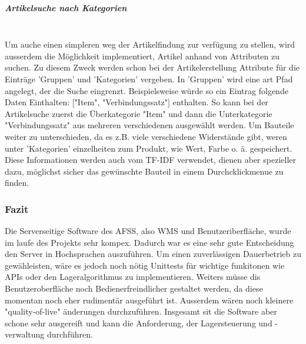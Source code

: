 \subparagraph{Artikelsuche nach Kategorien}\mbox{}\\
Um auche einen simpleren weg der Artikelfindung zur verfügung zu stellen, wird ausserdem die Möglichkeit implementiert, Artikel anhand von Attributen zu suchen. Zu diesem Zweck werden schon bei der Artikelerstellung Attribute für die Einträge 'Gruppen' und 'Kategorien' vergeben. In 'Gruppen' wird eine art Pfad angelegt, der die Suche eingrenzt. Beispielsweise würde so ein Eintrag folgende Daten Einthalten: ["Item", "Verbindungssatz"] enthalten. So kann bei der Artikelsuche zuerst die Überkategorie "Item" und dann die Unterkategorie "Verbindungssatz" aus mehreren verschiedenen ausgewählt werden. Um Bauteile weiter zu unterschieden, da es z.B. viele verschiedene Widerstände gibt, weren unter 'Kategorien' einzelheiten zum Produkt, wie Wert, Farbe o. ä. gespeichert.\\ 
Diese Informationen werden auch vom TF-IDF verwendet, dienen aber spezieller dazu, möglichst sicher das gewünschte Bauteil in einem Durchcklickmenue zu finden.

\subsubsection{Fazit}
Die Serverseitige Software des AFSS, also WMS und Benutzeriberfläche, wurde im laufe des Projekts sehr kompex. Dadurch war es eine sehr gute Entscheidung den Server in Hochsprachen auszuführen. Um einen zuverlässigen Dauerbetrieb zu gewähleisten, wäre es jedoch noch nötig Unittests für wichtige funkitonen wie APIs oder den Lageralgorithmus zu implementieren. Weiters müsse dis Benutzeroberfläche noch Bedienerfreindlicher gestaltet werden, da diese momentan noch eher rudimentär ausgeführt ist. Ausserdem wären noch kleinere "quality-of-live" änderungen durchzuführen. Insgesamt sit die Software aber schone sehr ausgereift und kann die Anforderung, der Lagersteuerung und -verwaltung durchführen. 


